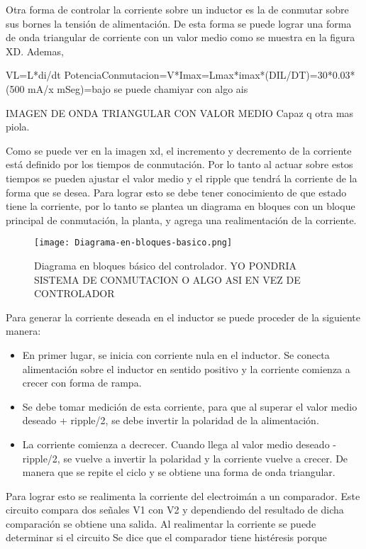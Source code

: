 Otra forma de controlar la corriente sobre un inductor es la de conmutar sobre sus bornes la tensión de alimentación. De esta forma se puede lograr una forma de onda triangular de corriente con un valor medio como se muestra en la figura XD. Ademas,

VL=L*di/dt
PotenciaConmutacion=V*Imax=Lmax*imax*(DIL/DT)=30*0.03*(500 mA/x mSeg)=bajo se puede chamiyar con algo ais


IMAGEN DE ONDA TRIANGULAR CON VALOR MEDIO Capaz q otra mas piola.

Como se puede ver en la imagen xd, el incremento y decremento de la corriente está definido por los tiempos de conmutación. Por lo tanto al actuar sobre estos tiempos se pueden ajustar el valor medio y el ripple que tendrá la corriente de la forma que se desea. Para lograr esto se debe tener conocimiento de que estado tiene la corriente, por lo tanto se plantea un diagrama en bloques con un bloque principal de conmutación, la planta, y agrega una realimentación de la corriente.

\begin{figure}[H]
	\centering
	\texttt{[image: Diagrama-en-bloques-basico.png]}
	\caption{Diagrama en bloques básico del controlador. YO PONDRIA SISTEMA DE CONMUTACION O ALGO ASI EN VEZ DE CONTROLADOR}
	\label{fig:img_diagrama_bloques_basico}
\end{figure}

Para generar la corriente deseada en el inductor se puede proceder de la siguiente manera:

\begin{itemize}
\item En primer lugar, se inicia con corriente nula en el inductor. Se conecta alimentación sobre el inductor en sentido positivo y la corriente comienza a crecer con forma de rampa.
\item Se debe tomar medición de esta corriente, para que al superar el valor medio deseado + ripple/2, se debe invertir la polaridad de la alimentación.
\item La corriente comienza a decrecer. Cuando llega al valor medio deseado - ripple/2, se vuelve a invertir la polaridad y la corriente vuelve a crecer. De manera que se repite el ciclo y se obtiene una forma de onda triangular.
\end{itemize}

Para lograr esto se realimenta la corriente del electroimán a un comparador. Este circuito compara dos señales V1 con V2 y dependiendo del resultado de dicha comparación se obtiene una salida. Al realimentar la corriente se puede determinar si el circuito 
Se dice que el comparador tiene histéresis porque



